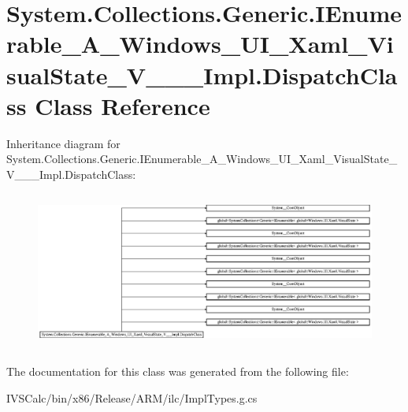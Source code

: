 \hypertarget{class_system_1_1_collections_1_1_generic_1_1_i_enumerable___a___windows___u_i___xaml___visual_st0a79ef73421fd29666aa505ad88aa709}{}\section{System.\+Collections.\+Generic.\+I\+Enumerable\+\_\+\+A\+\_\+\+Windows\+\_\+\+U\+I\+\_\+\+Xaml\+\_\+\+Visual\+State\+\_\+\+V\+\_\+\+\_\+\+\_\+\+Impl.\+Dispatch\+Class Class Reference}
\label{class_system_1_1_collections_1_1_generic_1_1_i_enumerable___a___windows___u_i___xaml___visual_st0a79ef73421fd29666aa505ad88aa709}
Inheritance diagram for System.\+Collections.\+Generic.\+I\+Enumerable\+\_\+\+A\+\_\+\+Windows\+\_\+\+U\+I\+\_\+\+Xaml\+\_\+\+Visual\+State\+\_\+\+V\+\_\+\+\_\+\+\_\+\+Impl.\+Dispatch\+Class\+:\begin{figure}[H]
\begin{center}
\leavevmode
\includegraphics[height=5.238095cm]{class_system_1_1_collections_1_1_generic_1_1_i_enumerable___a___windows___u_i___xaml___visual_st0a79ef73421fd29666aa505ad88aa709}
\end{center}
\end{figure}


The documentation for this class was generated from the following file\+:\begin{DoxyCompactItemize}
\item 
I\+V\+S\+Calc/bin/x86/\+Release/\+A\+R\+M/ilc/Impl\+Types.\+g.\+cs\end{DoxyCompactItemize}

